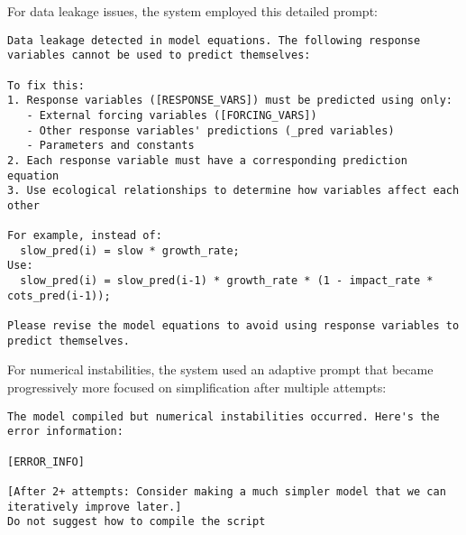 For data leakage issues, the system employed this detailed prompt:

\begin{lstlisting}
Data leakage detected in model equations. The following response variables cannot be used to predict themselves:

To fix this:
1. Response variables ([RESPONSE_VARS]) must be predicted using only:
   - External forcing variables ([FORCING_VARS])
   - Other response variables' predictions (_pred variables)
   - Parameters and constants
2. Each response variable must have a corresponding prediction equation
3. Use ecological relationships to determine how variables affect each other

For example, instead of:
  slow_pred(i) = slow * growth_rate;
Use:
  slow_pred(i) = slow_pred(i-1) * growth_rate * (1 - impact_rate * cots_pred(i-1));

Please revise the model equations to avoid using response variables to predict themselves.
\end{lstlisting}

For numerical instabilities, the system used an adaptive prompt that became progressively more focused on simplification after multiple attempts:

\begin{lstlisting}
The model compiled but numerical instabilities occurred. Here's the error information:

[ERROR_INFO]

[After 2+ attempts: Consider making a much simpler model that we can iteratively improve later.]
Do not suggest how to compile the script
\end{lstlisting}
